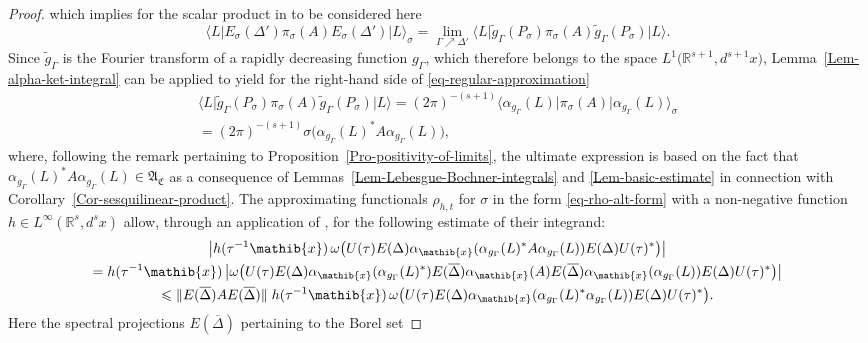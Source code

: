 \documentclass[11pt,twoside,openright]{report}
\theoremstyle{definition}
\theoremstyle{plain}
\theoremstyle{remark}
\theoremstyle{assumption}
\newcommand{\babs}[1]{\bigl\lvert #1 \bigr\rvert}
\newcommand{\norm}[1]{\lVert #1 \rVert}
\newcommand{\scpx}[3]{\langle #1 \vert #2 \vert #3 \rangle}
\newcommand{\xib}{\mathib{x}}
\newcommand{\Rs}{\mathbb{R}^s}
\newcommand{\Rsone}{\mathbb{R}^{s + 1}}
\newcommand{\AC}{\mathfrak{A}_\mathfrak{C}}
\newcommand{\ED}{E ( \Delta )}
\newcommand{\EDbar}{E ( \overline{\Delta} )}
\newcommand{\EsDprime}{E_\sigma ( \Delta' )}
\newcommand{\agGamma}{\alpha_{g_\Gamma}}
\newcommand{\aibx}{\alpha_\mathib{x}}
\begin{document}
\begin{proof}
  which implies for the scalar product in to be considered here
  \begin{equation}
    \label{eq-regular-approximation}
    \scpx{L}{\EsDprime \pi_\sigma ( A ) \EsDprime}{L}_\sigma =
    \lim_{\Gamma \nearrow \Delta'} \scpx{L}{\tilde{g}_\Gamma (
    P_\sigma ) \pi_\sigma ( A ) \tilde{g}_\Gamma ( P_\sigma )}{L}
    \text{.}
  \end{equation}
  Since $\tilde{g}_\Gamma$ is the Fourier transform of a rapidly
  decreasing function $g_\Gamma$, which therefore belongs to the space
  $L^1 \bigl( \Rsone , d^{s + 1} x \bigr)$,
  Lemma~\ref{Lem-alpha-ket-integral} can be applied to yield for the
  right-hand side of \eqref{eq-regular-approximation}
  \begin{multline}
    \label{eq-alpha-g-reformulation}
    \scpx{L}{\tilde{g}_\Gamma ( P_\sigma ) \pi_\sigma ( A )
    \tilde{g}_\Gamma ( P_\sigma )}{L} = ( 2 \pi )^{- ( s + 1 )}
    \scpx{\agGamma ( L )}{\pi_\sigma ( A )}{\agGamma ( L )}_\sigma \\
    = ( 2 \pi )^{- ( s + 1 )} \sigma \bigl( \agGamma ( L )^* A
    \agGamma ( L ) \bigr) \text{,}
  \end{multline}
  where, following the remark pertaining to
  Proposition~\ref{Pro-positivity-of-limits}, the ultimate expression
  is based on the fact that $\agGamma ( L )^* A \agGamma ( L ) \in
  \AC$ as a consequence of Lemmas~\ref{Lem-Lebesgue-Bochner-integrals}
  and \ref{Lem-basic-estimate} in connection with
  Corollary~\ref{Cor-sesquilinear-product}. The approximating
  functionals $\rho_{h , t}$ for $\sigma$ in the form
  \eqref{eq-rho-alt-form} with a non-negative function $h \in
  L^\infty ( \Rs , d^s x )$ allow, through an application of
  \cite[Proposition~2.3.11]{bratteli/robinson:1987}, for the following
  estimate of their integrand:
  \begin{multline*}
    \babs{h ( \tau^{-1} \xib ) \, \omega \bigl( U ( \tau ) \ED \aibx (
    \agGamma ( L )^* A \agGamma ( L ) ) \ED U ( \tau )^* \bigr)} \\
    =  h ( \tau^{-1} \xib ) \, \babs{\omega \bigl( U ( \tau ) \ED
    \aibx (\agGamma ( L )^* ) \EDbar \aibx ( A ) \EDbar \aibx (
    \agGamma ( L ) ) \ED U ( \tau )^* \bigr)} \\
    \leqslant \norm{\EDbar A \EDbar} \; h ( \tau^{-1} \xib ) \, \omega
    \bigl( U ( \tau ) \ED \aibx ( \agGamma ( L )^* \agGamma ( L ) )
    \ED U ( \tau )^* \bigr) \text{.}
  \end{multline*}
  Here the spectral projections $\EDbar$ pertaining to the Borel set

\end{proof}
\end{document}
